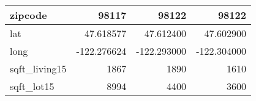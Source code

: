 \begin{table}[H]
\begin{tabular}{|l|r|r|r|}
\hline zipcode & \cellcolor[rgb]{0.9, 0.54, 0.52} 98117 & 98122 & 98122 \\
\hline lat & \cellcolor[rgb]{0.9, 0.54, 0.52} 47.618577 & 47.612400 & 47.602900 \\
\hline long & \cellcolor[rgb]{0.9, 0.54, 0.52} -122.276624 & \cellcolor[rgb]{0.9, 0.54, 0.52} -122.293000 & \cellcolor[rgb]{0.9, 0.54, 0.52} -122.304000 \\
\hline sqft\_living15 & \cellcolor[rgb]{0.9, 0.54, 0.52} 1867 & 1890 & 1610 \\
\hline sqft\_lot15 & \cellcolor[rgb]{0.9, 0.54, 0.52} 8994 & 4400 & 3600 \\
\hline
\end{tabular}
\end{table}
